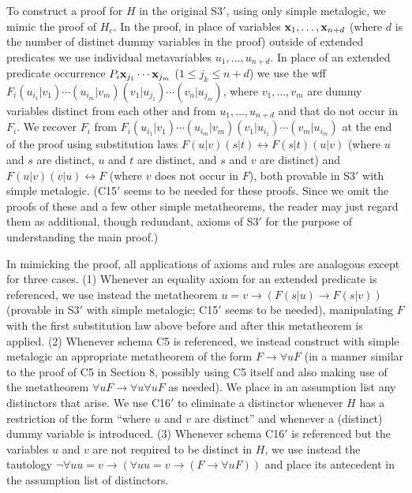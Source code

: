 \documentclass[leqno]{article}
\begin{document}
     To construct a proof for $H$ in the original S3\mbox{$'$}, using only
simple metalogic, we mimic the proof of $H_e$.  In the proof, in place of
variables ${\bf x}_1,\ldots ,{\bf x}_{n+d}$ (where $d$ is the number of
distinct dummy variables in the proof) outside of extended predicates we use
individual metavariables $u_1, \ldots ,u_{n+d}$.  In place of an extended
predicate occurrence $P_i{\bf x}_{j_1}\cdots {\bf x}_{j_m}$ ($1 \le j_k \le
n+d$) we use the wff $F_i(u_{i_1}|v_1) \cdots (u_{i_m}|v_m) (v_1|u_{j_1})
\cdots  (v_n|u_{j_m})$, where $v_1,\ldots ,v_m$ are dummy variables distinct
from each other and from $u_1, \ldots ,u_{n+d}$ and that do not occur in
$F_i$.  We recover $F_i$ from $F_i(u_{i_1}|v_1) \cdots (u_{i_m}|v_m)
(v_1|u_{i_1}) \cdots (v_m|u_{i_m})$ at the end of the proof using
substitution laws $F(u|v) (s|t) \leftrightarrow F(s|t) (u|v)$ (where $u$ and
$s$ are distinct, $u$ and $t$ are distinct, and $s$ and $v$ are distinct) and
$F(u|v) (v|u) \leftrightarrow F$ (where $v$ does not occur in $F$), both
provable in S3\mbox{$'$} with simple metalogic. (C15\mbox{$'$} seems to be
needed for these proofs.  Since we omit the proofs of these and a few other
simple metatheorems, the reader may just regard them as additional,
though redundant, axioms of S3\mbox{$'$} for the purpose of understanding
the main proof.)

     In mimicking the proof, all applications of axioms and rules are
analogous except for three cases.  (1) Whenever an equality axiom for an
extended predicate is referenced, we use instead the metatheorem $u=v
\rightarrow (F(s|u)\rightarrow F(s|v))$ (provable in S3\mbox{$'$} with simple
metalogic; C15\mbox{$'$} seems to be needed), manipulating $F$ with the
first substitution law above before and after this metatheorem is applied.
(2) Whenever schema C5 is referenced, we instead construct with simple
metalogic an appropriate metatheorem of the form $F\rightarrow \forall u F$
(in a manner similar to the proof of C5 in Section 8, possibly using C5
itself and also making use of the metatheorem $\forall u F \rightarrow
\forall u\forall u F$ as needed).  We place in an assumption list any
distinctors that arise.  We use C16\mbox{$'$} to eliminate a distinctor
whenever $H$ has a restriction of the form ``where $u$ and $v$ are distinct''
and whenever a (distinct) dummy variable is introduced.  (3) Whenever schema
C16\mbox{$'$} is referenced but the variables $u$ and $v$ are not required to
be distinct in $H$, we use instead the tautology $\lnot \forall
uu=v\rightarrow(\forall uu=v\rightarrow (F\rightarrow \forall uF))$ and place
its antecedent in the assumption list of distinctors.
\end{document}

